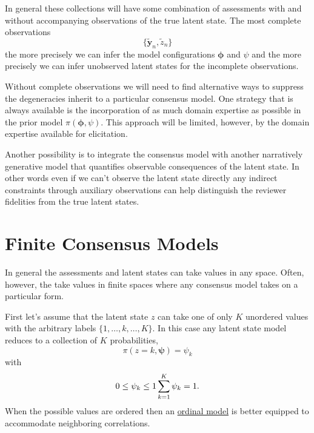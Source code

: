 \documentclass[
  letterpaper,
  DIV=11,
  numbers=noendperiod]{scrartcl}
\begin{document}
In general these collections will have some combination of assessments
with and without accompanying observations of the true latent state. The
most complete observations \[
\{ \tilde{\mathbf{y}}_{n}, \tilde{z}_{n} \}
\] the more precisely we can infer the model configurations
\(\boldsymbol{\phi}\) and \(\psi\) and the more precisely we can infer
unobserved latent states for the incomplete observations.

Without complete observations we will need to find alternative ways to
suppress the degeneracies inherit to a particular consensus model. One
strategy that is always available is the incorporation of as much domain
expertise as possible in the prior model
\(\pi( \boldsymbol{\phi}, \psi )\). This approach will be limited,
however, by the domain expertise available for elicitation.

Another possibility is to integrate the consensus model with another
narratively generative model that quantifies observable consequences of
the latent state. In other words even if we can't observe the latent
state directly any indirect constraints through auxiliary observations
can help distinguish the reviewer fidelities from the true latent
states.

\hypertarget{finite-consensus-models}{%
\section{Finite Consensus Models}\label{finite-consensus-models}}

In general the assessments and latent states can take values in any
space. Often, however, the take values in finite spaces where any
consensus model takes on a particular form.

First let's assume that the latent state \(z\) can take one of only
\(K\) unordered values with the arbitrary labels
\(\{1, \ldots, k, \ldots, K \}\). In this case any latent state model
reduces to a collection of \(K\) probabilities, \[
\pi(z = k, \boldsymbol{\psi}) = \psi_{k}
\] with \[
0 \le \psi_{k} \le 1
\\
\sum_{k = 1}^{K} \psi_{k} = 1.
\] When the possible values are ordered then an
\href{https://betanalpha.github.io/assets/case_studies/ordinal_regression.html}{ordinal
model} is better equipped to accommodate neighboring correlations.
\end{document}
